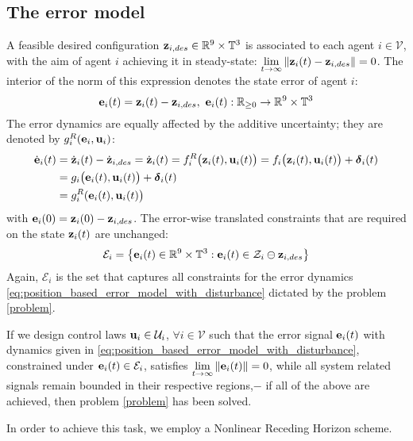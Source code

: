 \subsection{The error model}

A feasible desired configuration
$\bm{\mathbf{z}}_{i,des} \in \mathbb{R}^9 \times \mathbb{T}^3$
is associated to each agent $i \in \mathcal{V}$, with the aim of agent $i$
achieving it in steady-state:
$\lim\limits_{t \to \infty} \|\bm{\mathbf{z}}_i(t) - \bm{\mathbf{z}}_{i,des}\| = 0$. The
interior of the norm of this expression denotes the state error of agent $i$:
$$\bm{\mathbf{e}}_i(t) = \bm{\mathbf{z}}_i(t) - \bm{\mathbf{z}}_{i,des},\ \bm{\mathbf{e}}_i(t) :
\mathbb{R}_{\geq 0} \to \mathbb{R}^9 \times \mathbb{T}^3$$
The error dynamics are equally affected by the additive uncertainty;
they are denoted by $g_i^R(\bm{\mathbf{e}}_i, \bm{\mathbf{u}}_i)$:
\begin{align}
  \dot{\bm{\mathbf{e}}}_i(t) &= \dot{\bm{\mathbf{z}}}_i(t) - \dot{\bm{\mathbf{z}}}_{i,des} =
  \dot{\bm{\mathbf{z}}}_i(t) = f_i^R\big(\bm{\mathbf{z}}_i(t), \bm{\mathbf{u}}_i(t)\big) =  f_i \big(\bm{\mathbf{z}}_i (t), \bm{\mathbf{u}}_i (t)\big) + \bm{\mathbf{\delta}}_i(t) \\
                      &=g_i \big(\bm{\mathbf{e}}_i (t), \bm{\mathbf{u}}_i (t)\big) + \bm{\mathbf{\delta}}_i(t) \\
                      &= g_i^R(\bm{\mathbf{e}}_i(t), \bm{\mathbf{u}}_i(t)\big)
    \label{eq:position_based_error_model_with_disturbance}
\end{align}
with $\bm{\mathbf{e}}_i(0) = \bm{\mathbf{z}}_i(0) - \bm{\mathbf{z}}_{i,des}$.
The error-wise translated constraints that are required on the state
$\bm{\mathbf{z}}_i(t)$ are unchanged:
$$\mathcal{E}_i = \big\{\bm{\mathbf{e}}_i(t) \in \mathbb{R}^9 \times \mathbb{T}^3 :
\bm{\mathbf{e}}_i(t) \in \mathcal{Z}_i \ominus \bm{\mathbf{z}}_{i,des} \big\}$$
Again, $\mathcal{E}_i $ is the set that captures all constraints for the error
dynamics \eqref{eq:position_based_error_model_with_disturbance} dictated
by the problem \eqref{problem}.

If we design control laws $\bm{\mathbf{u}}_i \in \mathcal{U}_i$,
$\forall i \in \mathcal{V}$ such that the error signal $\bm{\mathbf{e}}_i(t)$ with
dynamics given in \eqref{eq:position_based_error_model_with_disturbance}, constrained under
$\bm{\mathbf{e}}_i(t) \in \mathcal{E}_i$, satisfies
$\lim\limits_{t \to \infty} \|\bm{\mathbf{e}}_i(t)\| = 0$, while all system related
signals remain bounded in their respective regions,$-$ if all of the above are
achieved, then problem \eqref{problem} has been solved.

In order to achieve this task, we employ a Nonlinear Receding Horizon scheme.
